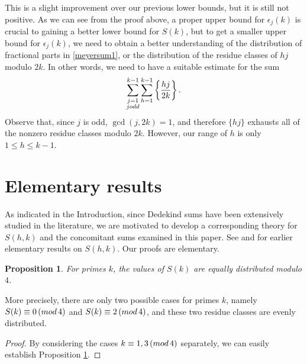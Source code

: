 \documentclass[11pt,reqno]{amsart}
\newcommand{\df}{\dfrac}
\renewcommand{\pmod}[1]{\,(\textup{mod}\,#1)}
\theoremstyle{plain}
\numberwithin{equation}{section}
\newtheorem{proposition}[theorem]{Proposition}
\begin{document}
This is a slight improvement over our previous lower bounds, but it is still not positive. As we can see from the proof above, a proper upper bound for $\epsilon_j(k)$ is crucial to gaining a better lower bound for $S(k)$, but to get a smaller upper bound for $\epsilon_j(k)$, we need to obtain a better understanding of the distribution of fractional parts in \eqref{meyersum1}, or the distribution of the residue classes of $hj$ modulo $2k$. In other words, we need to have a suitable estimate for the sum
$$\sum_{\substack{j=1\\j \textup{ odd }}}^{k-1}\sum_{h=1}^{k-1}\left\{\df{hj}{2k}\right\}.$$
 Observe that, since $j$ is odd, $\gcd(j,2k)=1$, and therefore $\{hj\}$ exhausts all of the nonzero residue classes modulo $2k$.  However, our range of $h$ is only $1\leq h\leq k-1$.


\section{Elementary results}\label{elementary}

As indicated in the Introduction, since Dedekind sums have been extensively studied in the literature, we are motivated to develop a corresponding theory for $S(h,k)$ and the concomitant sums examined in this paper.  See \cite{jm1} and \cite{jm2} for earlier elementary results on $S(h,k)$. Our proofs are elementary.


\begin{proposition}\label{distrib}
    For primes $k$, the values of $S(k)$ are equally distributed modulo $4$.
\end{proposition}

More precisely, there are only two possible cases for primes $k$, namely  $S(k)\equiv 0 \pmod{4}$ and $S(k)\equiv 2 \pmod{4}$, and these two residue classes are evenly distributed.

\begin{proof} By considering the cases $k\equiv 1,3 \pmod 4$ separately, we can easily establish Proposition \ref{distrib}. \end{proof}

\end{document}
